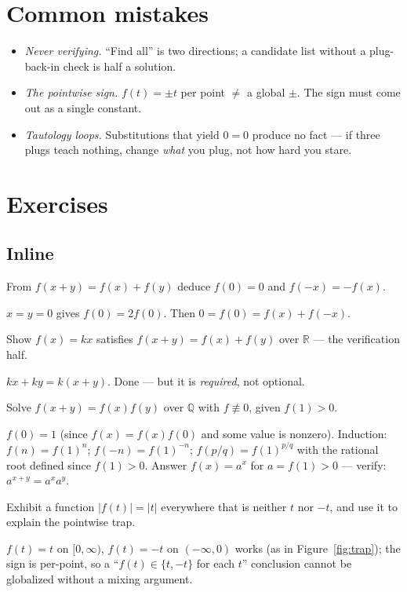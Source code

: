\section{Common mistakes}
\begin{itemize}
\item \emph{Never verifying.} ``Find all'' is two directions; a
candidate list without a plug-back-in check is half a solution.
\item \emph{The pointwise sign.} $f(t)=\pm t$ per point $\ne$ a global
$\pm$. The sign must come out as a single constant.
\item \emph{Tautology loops.} Substitutions that yield $0=0$ produce no
fact --- if three plugs teach nothing, change \emph{what} you plug, not
how hard you stare.
\end{itemize}

\section*{Exercises}
\subsection*{Inline}
\begin{exercise}[easy]\label{exr:f1}
From $f(x+y)=f(x)+f(y)$ deduce $f(0)=0$ and $f(-x)=-f(x)$.
\end{exercise}
\begin{solution}
$x=y=0$ gives $f(0)=2f(0)$. Then $0=f(0)=f(x)+f(-x)$.
\end{solution}
\begin{exercise}[easy]\label{exr:f2}
Show $f(x)=kx$ satisfies $f(x+y)=f(x)+f(y)$ over $\mathbb R$ --- the
verification half.
\end{exercise}
\begin{solution}
$kx+ky = k(x+y)$. Done --- but it is \emph{required}, not optional.
\end{solution}
\begin{exercise}[medium]\label{exr:f3}
Solve $f(x+y)=f(x)f(y)$ over $\mathbb Q$ with $f\not\equiv0$, given $f(1)>0$.
\end{exercise}
\begin{solution}
$f(0)=1$ (since $f(x)=f(x)f(0)$ and some value is nonzero). Induction:
$f(n)=f(1)^n$; $f(-n)=f(1)^{-n}$; $f(p/q)=f(1)^{p/q}$ with the rational
root defined since $f(1)>0$. Answer $f(x)=a^x$ for $a=f(1)>0$ ---
verify: $a^{x+y}=a^xa^y$.
\end{solution}
\begin{exercise}[medium]\label{exr:f4}
Exhibit a function $|f(t)|=|t|$ everywhere that is neither $t$ nor $-t$,
and use it to explain the pointwise trap.
\end{exercise}
\begin{solution}
$f(t)=t$ on $[0,\infty)$, $f(t)=-t$ on $(-\infty,0)$ works (as in
Figure~\ref{fig:trap}); the sign is per-point, so a ``$f(t)\in\{t,-t\}$
for each $t$'' conclusion cannot be globalized without a mixing argument.
\end{solution}
